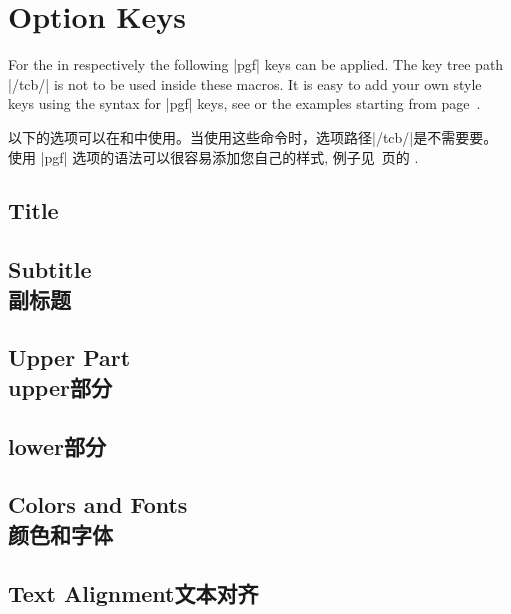 \section{Option Keys}\label{sec:optkeys}%
%
For the  in  respectively 
the following |pgf| keys can be applied. The key tree path |/tcb/| is not to
be used inside these macros. It is easy to add your own style keys using
the syntax for |pgf| keys, see \cite{tantau:tikz_and_pgf,sturm:latex} or the examples
starting from page~\pageref{sec:latextutorial}.

以下的选项可以在和中使用。当使用这些命令时，选项路径|/tcb/|是不需要要。
使用 |pgf| 选项的语法可以很容易添加您自己的样式, 例子见~\pageref{sec:latextutorial}页的 \cite{tantau:tikz_and_pgf,sturm:latex} .


\subsection{Title}%

\subsection{Subtitle\\副标题}

\subsection{Upper Part\\upper部分}

\subsection{lower部分}

\subsection{Colors and Fonts\\颜色和字体}

% 
\subsection{Text Alignment文本对齐}


